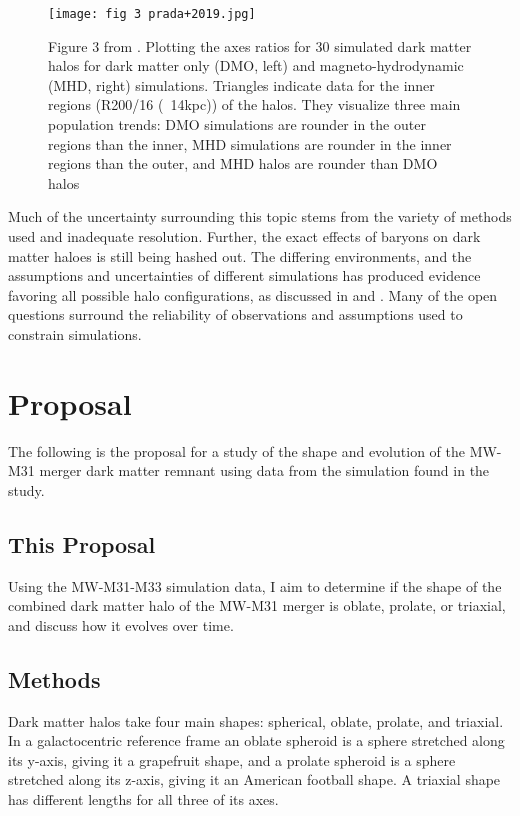 \documentclass[fleqn,usenatbib]{mnras}
\begin{document}
\begin{figure}
	\texttt{[image: fig 3 prada+2019.jpg]}
    \caption{Figure 3 from \citet{Prada_2019}. Plotting the axes ratios for 30 simulated dark matter halos for dark matter only (DMO, left) and magneto-hydrodynamic (MHD, right) simulations. Triangles indicate data for the inner regions (R200/16 (~14kpc)) of the halos. They visualize three main population trends: DMO simulations are rounder in the outer regions than the inner, MHD simulations are rounder in the inner regions than the outer, and MHD halos are rounder than DMO halos}
    \label{fig:MHD vs DMO}
\end{figure}

Much of the uncertainty surrounding this topic stems from the variety of methods used and inadequate resolution. Further, the exact effects of baryons on dark matter haloes is still being hashed out. The differing environments, and the assumptions and uncertainties of different simulations has produced evidence favoring all possible halo configurations, as discussed in \citet{Chua_2019} and \citet{Prada_2019}. Many of the open questions surround the reliability of observations and assumptions used to constrain simulations.


\section{Proposal}

The following is the proposal for a study of the shape and evolution of the MW-M31 merger dark matter remnant using data from the simulation found in the \citet{van_der_Marel_2012} study.

\subsection{This Proposal}

Using the MW-M31-M33 simulation data, I aim to determine if the shape of the combined dark matter halo of the MW-M31 merger is oblate, prolate, or triaxial, and discuss how it evolves over time.

\subsection{Methods}

Dark matter halos take four main shapes: spherical, oblate, prolate, and triaxial. In a galactocentric reference frame an oblate spheroid is a sphere stretched along its y-axis, giving it a grapefruit shape, and a prolate spheroid is a sphere stretched along its z-axis, giving it an American football shape. A triaxial shape has different lengths for all three of its axes.
\end{document}
